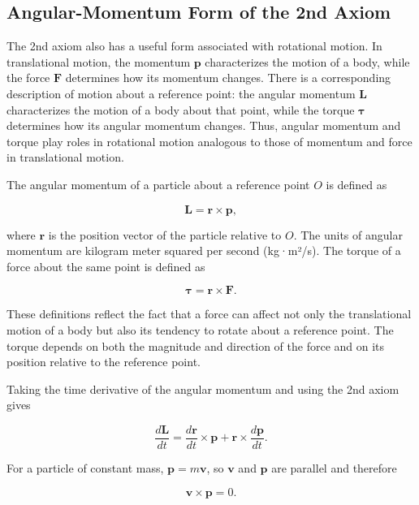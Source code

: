 \documentclass[12pt]{article}
\begin{document}
\subsection{Angular-Momentum Form of the 2nd Axiom}

The 2nd axiom also has a useful form associated with rotational motion.
In translational motion, the momentum $\mathbf{p}$ characterizes the
motion of a body, while the force $\mathbf{F}$ determines how its
momentum changes. There is a corresponding description of motion about
a reference point: the angular momentum $\mathbf{L}$ characterizes the
motion of a body about that point, while the torque $\boldsymbol{\tau}$
determines how its angular momentum changes. Thus, angular momentum and
torque play roles in rotational motion analogous to those of momentum
and force in translational motion.

The angular momentum of a particle about a reference point $O$ is
defined as

\begin{equation}
\mathbf{L} = \mathbf{r}\times\mathbf{p},
\end{equation}

where $\mathbf{r}$ is the position vector of the particle relative
to $O$. The units of angular momentum are kilogram meter squared per second (kg·m²/s). The torque of a force about the same point is defined as

\begin{equation}
\boldsymbol{\tau}
= \mathbf{r}\times\mathbf{F}.
\end{equation}

These definitions reflect the fact that a force can affect not only
the translational motion of a body but also its tendency to rotate
about a reference point. The torque depends on both the magnitude and
direction of the force and on its position relative to the reference
point.

Taking the time derivative of the angular momentum and using the
2nd axiom gives

\begin{equation}
\frac{d\mathbf{L}}{dt}
= \frac{d\mathbf{r}}{dt}\times\mathbf{p}
+ \mathbf{r}\times\frac{d\mathbf{p}}{dt}.
\end{equation}

For a particle of constant mass, $\mathbf{p}=m\mathbf{v}$, so
$\mathbf{v}$ and $\mathbf{p}$ are parallel and therefore

\begin{equation}
\mathbf{v}\times\mathbf{p}=0.
\end{equation}
\end{document}
